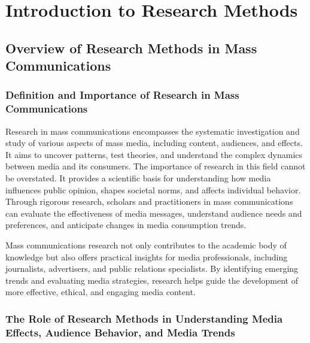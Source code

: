 \documentclass[
]{book}
\begin{document}
\hypertarget{introduction-to-research-methods}{%
\chapter{Introduction to Research Methods}\label{introduction-to-research-methods}}

\hypertarget{overview-of-research-methods-in-mass-communications}{%
\section{Overview of Research Methods in Mass Communications}\label{overview-of-research-methods-in-mass-communications}}

\hypertarget{definition-and-importance-of-research-in-mass-communications}{%
\subsection*{Definition and Importance of Research in Mass Communications}\label{definition-and-importance-of-research-in-mass-communications}}

Research in mass communications encompasses the systematic investigation and study of various aspects of mass media, including content, audiences, and effects. It aims to uncover patterns, test theories, and understand the complex dynamics between media and its consumers. The importance of research in this field cannot be overstated. It provides a scientific basis for understanding how media influences public opinion, shapes societal norms, and affects individual behavior. Through rigorous research, scholars and practitioners in mass communications can evaluate the effectiveness of media messages, understand audience needs and preferences, and anticipate changes in media consumption trends.

Mass communications research not only contributes to the academic body of knowledge but also offers practical insights for media professionals, including journalists, advertisers, and public relations specialists. By identifying emerging trends and evaluating media strategies, research helps guide the development of more effective, ethical, and engaging media content.

\hypertarget{the-role-of-research-methods-in-understanding-media-effects-audience-behavior-and-media-trends}{%
\subsection*{The Role of Research Methods in Understanding Media Effects, Audience Behavior, and Media Trends}\label{the-role-of-research-methods-in-understanding-media-effects-audience-behavior-and-media-trends}}
\end{document}
